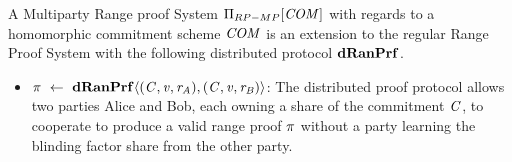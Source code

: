 \begin{definition}\label{def:pre:mp-rangeproof}
    A Multiparty Range proof System $\Pi_{RP-MP}[\mathit{COM}]$ with regards to a homomorphic commitment scheme $\mathit{COM}$ is an extension to the regular Range Proof System with the following
    distributed protocol $\mathbf{dRanPrf}$.
    \begin{itemize}
        \item $\pi ~\leftarrow~ \mathbf{dRanPrf} \langle(\mathit{C},\mathit{v},\mathit{r}_{\mathit{A}}),(\mathit{C},\mathit{v},\mathit{r}_{\mathit{B}})\rangle$: The distributed proof protocol allows two parties Alice and Bob, each owning a share of the
        commitment $\mathit{C}$, to cooperate to produce a valid range proof $\pi$ without a party learning the blinding factor share from the other party.
    \end{itemize}
\end{definition}